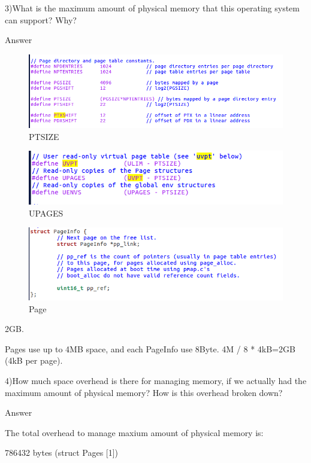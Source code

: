\begin{flushleft}
3)What is the maximum amount of physical memory that this operating system can support? Why?

{\Large Answer}
\end{flushleft}
\begin{figure}[H]
\centering
\includegraphics[width=0.8\linewidth]{figure/question4_3_1}
\caption{PTSIZE}
\end{figure}

\begin{figure}[H]
\centering
\includegraphics[width=0.8\linewidth]{figure/question4_3_2}
\caption{UPAGES}
\end{figure}

\begin{figure}[H]
\centering
\includegraphics[width=0.8\linewidth]{figure/question4_3_3}
\caption{Page}
\end{figure}

2GB.

Pages use up to 4MB space, and each PageInfo use 8Byte. 4M / 8 * 4kB=2GB (4kB per page).


\begin{flushleft}
4)How much space overhead is there for managing memory, if we actually had the maximum amount of physical memory? How is this overhead broken down?

{\Large Answer}
\end{flushleft}

The total overhead to manage maxium amount of physical memory is:

  786432 bytes (struct Pages [1])

